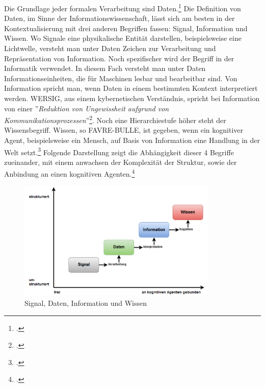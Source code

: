 \documentclass[12pt,a4paper]{article}
\begin{document}
Die Grundlage jeder formalen Verarbeitung sind Daten.\footcite[Ausführlich habe ich mich mit den theoretischen Grundlagen der Informationswissenschaft, Daten - Information - Wissen, in folgender Arbeit auseinander gesetzt:][]{pollin2017suchen} Die Definition von Daten, im Sinne der Informationswissenschaft, lässt sich am besten in der Kontextualisierung mit drei anderen Begriffen fassen: Signal, Information und Wissen. Wo Signale eine physikalische Entität darstellen, beispielsweise eine Lichtwelle, versteht man unter Daten Zeichen zur Verarbeitung und Repräsentation von Information. Noch spezifischer wird der Begriff in der Informatik verwendet. In diesem Fach versteht man unter Daten Informationseinheiten, die für Maschinen lesbar und bearbeitbar sind. Von Information spricht man, wenn Daten in einem bestimmten Kontext interpretiert werden. WERSIG, aus einem kybernetischen Verständnis, spricht bei Information von einer ''\textit{Reduktion von Ungewissheit aufgrund von Kommunikationsprozessen}''\footcite[][S.74]{wersig1971information}. Noch eine Hierarchiestufe höher steht der Wissensbegriff. Wissen, so FAVRE-BULLE, ist gegeben, wenn ein kognitiver Agent, beispielsweise ein Mensch, auf Basis von Information eine Handlung in der Welt setzt.\footcite[][S.93-97]{favre2001information} Folgende Darstellung zeigt die Abhängigkeit dieser 4 Begriffe zueinander, mit einem anwachsen der Komplexität der Struktur, sowie der Anbindung an einen kognitiven Agenten.\footcite[Eine ausführlichere Auseinandersetzung mit den Begriffen Daten, Information und Wissen findet sich in meiner ersten Abschlussarbeit.][Masterarbeit Graz, S.20-28]{pollin2017suchen}
\begin{figure}[H]
\centering
	\includegraphics[width=0.85\textwidth]{img/daten.png}  
    \caption[Signal, Daten, Information und Wissen. POLLIN Christopher: Vom Suchen, Stöbern und Finden : Information Retrieval am Beispiel der Digitalen Sammlung des Hans Gross Kriminalmuseums, Masterarbeit Graz, S.21 ]{Signal, Daten, Information und Wissen} \label{fig:daten}
\end{figure} 
\end{document}
